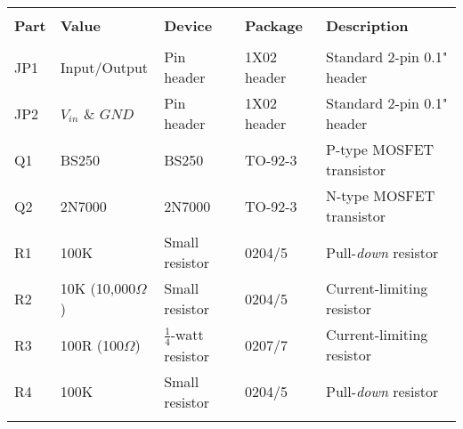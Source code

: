 \begin{tabular}{lllll}
\hline\\[\negsep]
\textbf{Part} & \textbf{Value} & \textbf{Device} & \textbf{Package} & \textbf{Description} \\[\sep]
\hline\\[\negsep]
JP1  &  Input/Output & Pin header    & 1X02 header     & Standard 2-pin 0.1" header \\[\sep]
JP2  &  $V_{in}$ \& $GND$ & Pin header & 1X02 header     & Standard 2-pin 0.1" header \\[\sep]
Q1   &  BS250       &  BS250         & TO-92-3     & P-type MOSFET transistor \\[\sep]
Q2   &  2N7000      & 2N7000         & TO-92-3     & N-type MOSFET transistor \\[\sep]
R1   &  100K        & Small resistor & 0204/5    & Pull-\emph{down} resistor \\[\sep]
R2   &  10K (10,000$\Omega$)         & Small resistor & 0204/5    & Current-limiting resistor \\[\sep]
R3   &  100R (100$\Omega$) & $\frac{1}{4}$-watt resistor & 0207/7 & Current-limiting resistor \\[\sep]
R4   &  100K       & Small resistor & 0204/5    & Pull-\emph{down} resistor \\[\sep]

\hline\\
\end{tabular}
